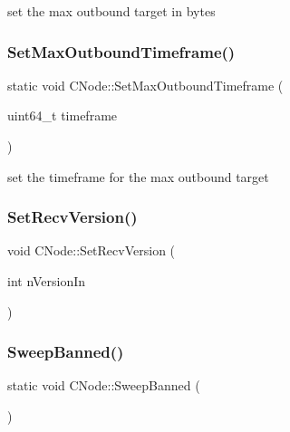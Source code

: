 set the max outbound target in bytes 

\mbox{\label{class_c_node_a5964ebb10e847c2f3c8066c9cb09263b}} 
\subsubsection{\texorpdfstring{Set\+Max\+Outbound\+Timeframe()}{SetMaxOutboundTimeframe()}}
{\footnotesize\ttfamily static void C\+Node\+::\+Set\+Max\+Outbound\+Timeframe (\begin{DoxyParamCaption}\item[{uint64\+\_\+t}]{timeframe }\end{DoxyParamCaption})\hspace{0.3cm}{\ttfamily [static]}}



set the timeframe for the max outbound target 

\mbox{\label{class_c_node_a94438c6285d1635c62ccff10593780e6}} 
\subsubsection{\texorpdfstring{Set\+Recv\+Version()}{SetRecvVersion()}}
{\footnotesize\ttfamily void C\+Node\+::\+Set\+Recv\+Version (\begin{DoxyParamCaption}\item[{int}]{n\+Version\+In }\end{DoxyParamCaption})\hspace{0.3cm}{\ttfamily [inline]}}

\mbox{\label{class_c_node_a2a65fc9928a735e79f7790f78a2eba02}} 
\subsubsection{\texorpdfstring{Sweep\+Banned()}{SweepBanned()}}
{\footnotesize\ttfamily static void C\+Node\+::\+Sweep\+Banned (\begin{DoxyParamCaption}{ }\end{DoxyParamCaption})\hspace{0.3cm}{\ttfamily [static]}}



